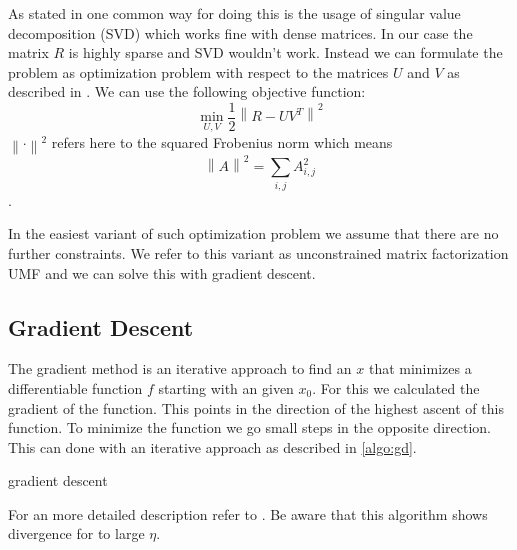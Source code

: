 \documentclass[DIV=14,twocolumn]{scrartcl}
\newcommand{\norm}[1]{\left\lVert#1\right\rVert}
\begin{document}
As stated in \cite{KoBeVo09} one common way for doing this is the usage of singular value decomposition (SVD) which works fine with dense matrices. In our case the matrix $R$ is highly sparse and SVD wouldn't work. Instead we can formulate the problem as optimization problem with respect to the matrices $U$ and $V$ as described in \cite{Ag16}. We can use the following objective function: 
$$\min_{U,V} \frac{1}{2}\norm{R-UV^T}^2$$ 
$\norm{\cdot}^2$ refers here to the squared Frobenius norm which means $$\norm{A}^2=\sum_{i,j}A_{i,j}^2$$.

In the easiest variant of such optimization problem we assume that there are no further constraints. We refer to this variant as unconstrained matrix factorization UMF and we can solve this with gradient descent.

\subsection{Gradient Descent}
The gradient method is an iterative approach to find an $x$ that minimizes a differentiable function $f$ starting with an given $x_0$. For this we calculated the gradient of the function. This points in the direction of the highest ascent of this function. To minimize the function we go small steps in the opposite direction. This can done with an iterative approach as described in \ref{algo:gd}. 

\begin{algorithm}
	\caption{gradient descent}
	\label{algo:gd}

\end{algorithm}
For an more detailed description refer to \cite{ShSh14}.
Be aware that this algorithm shows divergence for to large $\eta$. 
\end{document}
